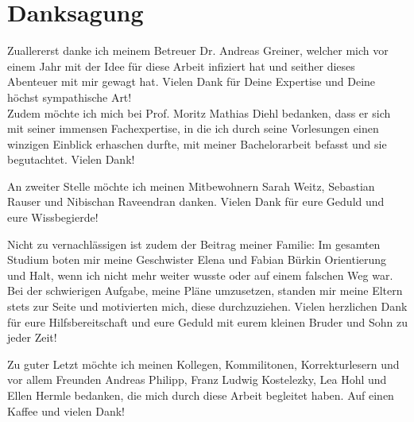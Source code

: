 \chapter{Danksagung}

Zuallererst danke ich meinem Betreuer Dr. Andreas Greiner, welcher mich vor einem Jahr mit der Idee für diese Arbeit infiziert hat und seither dieses Abenteuer mit mir gewagt hat.
Vielen Dank für Deine Expertise und Deine höchst sympathische Art!\\
Zudem möchte ich mich bei Prof. Moritz Mathias Diehl bedanken, dass er sich mit seiner immensen Fachexpertise, in die ich durch seine Vorlesungen einen winzigen Einblick erhaschen durfte, mit meiner Bachelorarbeit befasst und sie begutachtet. Vielen Dank!

An zweiter Stelle möchte ich meinen Mitbewohnern Sarah Weitz, Sebastian Rauser und Nibischan Raveendran danken.
Vielen Dank für eure Geduld
und eure Wissbegierde!

Nicht zu vernachlässigen ist zudem der Beitrag meiner Familie: Im gesamten Studium boten mir meine Geschwister Elena und Fabian Bürkin Orientierung und Halt, wenn ich nicht mehr weiter wusste oder auf einem falschen Weg war.
Bei der schwierigen Aufgabe, meine Pläne umzusetzen, standen mir meine Eltern stets zur Seite und motivierten mich, diese durchzuziehen. Vielen herzlichen Dank für eure Hilfsbereitschaft und eure Geduld mit eurem kleinen Bruder und Sohn zu jeder Zeit!

Zu guter Letzt möchte ich meinen Kollegen, Kommilitonen, Korrekturlesern und vor allem Freunden Andreas Philipp, Franz Ludwig Kostelezky, Lea Hohl und Ellen Hermle bedanken, die mich durch diese Arbeit begleitet haben. Auf einen Kaffee und vielen Dank!